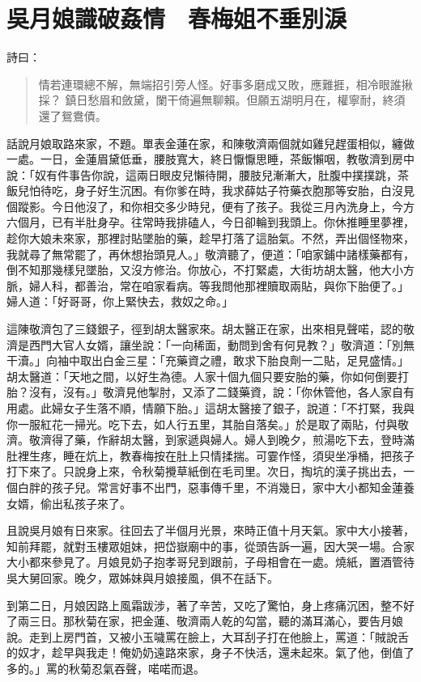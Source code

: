 
\chapter{吳月娘識破姦情　春梅姐不垂別淚}

詩曰：
\begin{quote}
情若連環總不解，無端招引旁人怪。好事多磨成又敗，應難捱，相冷眼誰揪採？
鎮日愁眉和斂黛，闌干倚遍無聊賴。但願五湖明月在，權寧耐，終須還了鴛鴦債。
\end{quote}

話說月娘取路來家，不題。單表金蓮在家，和陳敬濟兩個就如雞兒趕蛋相似，纏做一處。一日，金蓮眉黛低垂，腰肢寬大，終日懨懨思睡，茶飯懶咽，教敬濟到房中說：「奴有件事告你說，這兩日眼皮兒懶待開，腰肢兒漸漸大，肚腹中撲撲跳，茶飯兒怕待吃，身子好生沉困。有你爹在時，我求薛姑子符藥衣胞那等安胎，白沒見個蹤影。今日他沒了，和你相交多少時兒，便有了孩子。我從三月內洗身上，今方六個月，已有半肚身孕。往常時我排磕人，今日卻輪到我頭上。你休推睡里夢裡，趁你大娘未來家，那裡討貼墜胎的藥，趁早打落了這胎氣。不然，弄出個怪物來，我就尋了無常罷了，再休想抬頭見人。」敬濟聽了，便道：「咱家鋪中諸樣藥都有，倒不知那幾樣兒墜胎，又沒方修治。你放心，不打緊處，大街坊胡太醫，他大小方脈，婦人科，都善治，常在咱家看病。等我問他那裡贖取兩貼，與你下胎便了。」婦人道：「好哥哥，你上緊快去，救奴之命。」

這陳敬濟包了三錢銀子，徑到胡太醫家來。胡太醫正在家，出來相見聲喏，認的敬濟是西門大官人女婿，讓坐說：「一向稀面，動問到舍有何見教？」敬濟道：「別無干瀆。」向袖中取出白金三星：「充藥資之禮，敢求下胎良劑一二貼，足見盛情。」胡太醫道：「天地之間，以好生為德。人家十個九個只要安胎的藥，你如何倒要打胎？沒有，沒有。」敬濟見他掣肘，又添了二錢藥資，說：「你休管他，各人家自有用處。此婦女子生落不順，情願下胎。」這胡太醫接了銀子，說道：「不打緊，我與你一服紅花一掃光。吃下去，如人行五里，其胎自落矣。」於是取了兩貼，付與敬濟。敬濟得了藥，作辭胡太醫，到家遞與婦人。婦人到晚夕，煎湯吃下去，登時滿肚裡生疼，睡在炕上，教春梅按在肚上只情揉揣。可霎作怪，須臾坐凈桶，把孩子打下來了。只說身上來，令秋菊攪草紙倒在毛司里。次日，掏坑的漢子挑出去，一個白胖的孩子兒。常言好事不出門，惡事傳千里，不消幾日，家中大小都知金蓮養女婿，偷出私孩子來了。

且說吳月娘有日來家。往回去了半個月光景，來時正值十月天氣。家中大小接著，知前拜罷，就對玉樓眾姐妹，把岱嶽廟中的事，從頭告訴一遍，因大哭一場。合家大小都來參見了。月娘見奶子抱孝哥兒到跟前，子母相會在一處。燒紙，置酒管待吳大舅回家。晚夕，眾姊妹與月娘接風，俱不在話下。

到第二日，月娘因路上風霜跋涉，著了辛苦，又吃了驚怕，身上疼痛沉困，整不好了兩三日。那秋菊在家，把金蓮、敬濟兩人乾的勾當，聽的滿耳滿心，要告月娘說。走到上房門首，又被小玉噦罵在臉上，大耳刮子打在他臉上，罵道：「賊說舌的奴才，趁早與我走！俺奶奶遠路來家，身子不快活，還未起來。氣了他，倒值了多的。」罵的秋菊忍氣吞聲，喏喏而退。

